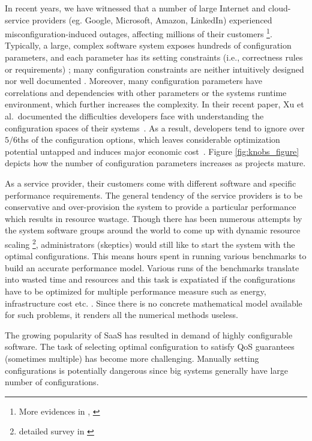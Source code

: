 \documentclass{newsig}
\begin{document}
 In recent years, we have witnessed that a number of large Internet and cloud-service providers (eg. Google, Microsoft, Amazon, LinkedIn) experienced misconfiguration-induced outages, affecting millions of their customers \cite{thomasthanks, brodkin2012,miller2012, liang2013 }\footnote{More evidences in \cite{barroso2013datacenter}, \cite{rabkin2013hadoop} }.  Typically, a large, complex software system exposes hundreds of configuration parameters, and each parameter has its setting constraints (i.e., correctness rules or requirements) \cite{kiciman2004discovering, nadi2014mining}; many configuration constraints are neither intuitively designed nor well documented \cite{rabkin2011static, xu2013not}.  Moreover, many configuration parameters have correlations and dependencies with other parameters or the system\textquotesingle s runtime environment, which further increases the complexity.  In their recent paper, Xu et al.\ documented the  difficulties developers face
with understanding  the configuration spaces of their systems~\cite{xu2015hey}. As a result, developers tend to ignore over $5/6$ths of the configuration options, which leaves considerable optimization potential untapped and induces major economic cost~\cite{xu2015hey}. Figure \ref{fig:knobs_figure} depicts how the number of configuration parameters increases
as projects mature. 



As a service provider, their customers come with different software and specific performance requirements. The general tendency of the service providers is to be conservative and over-provision the system to provide a particular performance which results in resource wastage. Though there has been numerous attempts by the system software groups around the world to come up with dynamic resource scaling \footnote{detailed survey in \cite{naskos2016cloud}}, administrators (skeptics) would still like to start the system with the optimal configurations. This means hours spent in running various benchmarks to build an accurate performance model. Various runs of the benchmarks translate into wasted time and resources and this task is expatiated if the configurations have to be optimized for multiple performance measure such as energy, infrastructure cost etc. \cite{neha2016}. Since there is no concrete mathematical model available for such problems, it renders all the numerical methods useless.
 
\begin{myshadowbox}
    The growing popularity of SaaS has resulted in demand of highly configurable software. The task of selecting optimal configuration to satisfy QoS guarantees (sometimes multiple) has become more challenging. Manually setting configurations is potentially dangerous since big systems generally have large number of configurations.
\end{myshadowbox}
\end{document}
